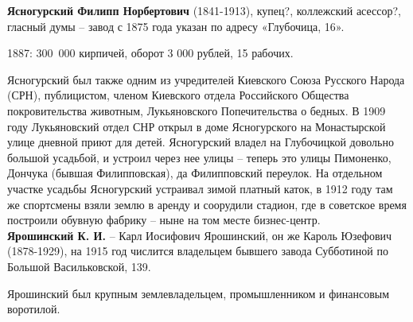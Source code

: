 \noindent\textbf{Ясногурский Филипп Норбертович} (1841-1913), купец?, коллежский асессор?, гласный думы – завод с 1875 года указан по адресу «Глубочица, 16». 

1887: \mbox{300 000} кирпичей, оборот 3 000 рублей, 15 рабочих.

Ясногурский был также одним из учредителей Киевского Союза Русского Народа (СРН), публицистом, членом Киевского отдела Российского Общества покровительства животным, Лукьяновского Попечительства о бедных. В 1909  году Лукьяновский отдел СНР открыл в доме Ясногурского на Монастырской улице дневной приют для детей. Ясногурский владел на Глубочицкой довольно большой усадьбой, и устроил через нее улицы – теперь это улицы Пимоненко, Дончука (бывшая Филипповская), да Филипповский переулок. На отдельном участке усадьбы Ясногурский устраивал зимой платный каток, в 1912 году там же спортсмены взяли землю в аренду и соорудили стадион, где в советское время построили обувную фабрику – ныне на том месте бизнес-центр.\\

\noindent\textbf{Ярошинский К. И.} – Карл Иосифович Ярошинский, он же Кароль Юзефович (1878-1929), на 1915 год числится владельцем бывшего завода Субботиной по Большой Васильковской, 139. 

Ярошинский был крупным землевладельцем, промышленником и финансовым воротилой.\\
